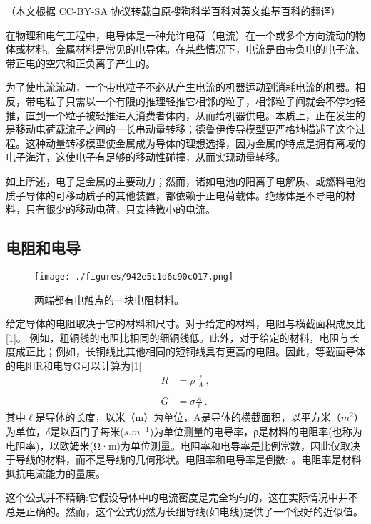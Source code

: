 
（本文根据 CC-BY-SA 协议转载自原搜狗科学百科对英文维基百科的翻译）

在物理和电气工程中，电导体是一种允许电荷（电流）在一个或多个方向流动的物体或材料。金属材料是常见的电导体。在某些情况下，电流是由带负电的电子流、带正电的空穴和正负离子产生的。

为了使电流流动，一个带电粒子不必从产生电流的机器运动到消耗电流的机器。相反，带电粒子只需以一个有限的推理轻推它相邻的粒子，相邻粒子间就会不停地轻推，直到一个粒子被轻推进入消费者体内，从而给机器供电。本质上，正在发生的是移动电荷载流子之间的一长串动量转移；德鲁伊传导模型更严格地描述了这个过程。这种动量转移模型使金属成为导体的理想选择，因为金属的特点是拥有离域的电子海洋，这使电子有足够的移动性碰撞，从而实现动量转移。

如上所述，电子是金属的主要动力；然而，诸如电池的阳离子电解质、或燃料电池质子导体的可移动质子的其他装置，都依赖于正电荷载体。绝缘体是不导电的材料，只有很少的移动电荷，只支持微小的电流。

\subsection{ 电阻和电导}
\begin{figure}[ht]
\centering
\texttt{[image: ./figures/942e5c1d6c90c017.png]}
\caption{两端都有电触点的一块电阻材料。} \label{fig_DDT_1}
\end{figure}
给定导体的电阻取决于它的材料和尺寸。对于给定的材料，电阻与横截面积成反比[1]。 例如，粗铜线的电阻比相同的细铜线低。此外，对于给定的材料，电阻与长度成正比；例如，长铜线比其他相同的短铜线具有更高的电阻。因此，等截面导体的电阻R和电导G可以计算为[1]
\begin{equation}
\begin{aligned}
R &= \rho \frac{\ell}{A}, \\\\
G &= \sigma \frac{A}{\ell}~.
\end{aligned}
\end{equation}
其中$\ell$是导体的长度，以米（m）为单位，A是导体的横截面积，以平方米（$m^2$）为单位，$\delta$是以西门子每米($s.m^{-1}$)为单位测量的电导率，ρ是材料的电阻率(也称为电阻率)，以欧姆米(Ω·m)为单位测量。电阻率和电导率是比例常数，因此仅取决于导线的材料，而不是导线的几何形状。电阻率和电导率是倒数:  。电阻率是材料抵抗电流能力的量度。



这个公式并不精确:它假设导体中的电流密度是完全均匀的，这在实际情况中并不总是正确的。然而，这个公式仍然为长细导线(如电线)提供了一个很好的近似值。

